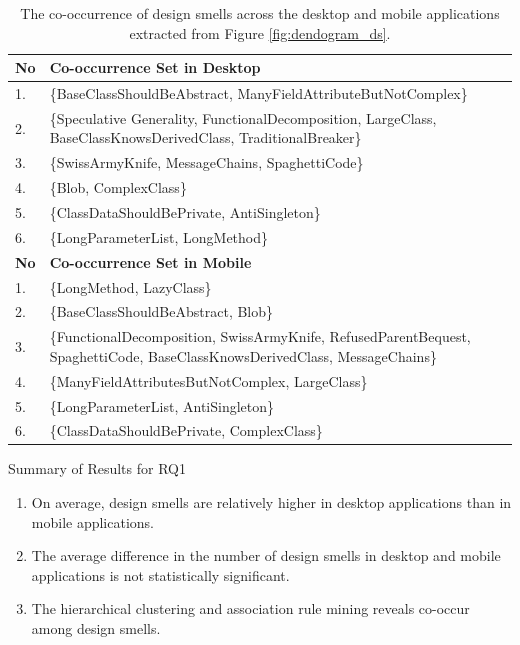 \documentclass[AMA,Times1COL]{WileyNJDv5} %
\begin{document}
	\begin{table}[h!]
	\centering %
	\caption{The co-occurrence of  design smells across the desktop and mobile applications extracted from Figure \ref{fig:dendogram_ds}.} %
	\begin{tabular*}{\textwidth}{@{\extracolsep\fill}ll@{\extracolsep\fill}}%
		
		\toprule
		\textbf{No} & \textbf{Co-occurrence Set in Desktop} \\
		\midrule
		1. & \{BaseClassShouldBeAbstract, ManyFieldAttributeButNotComplex\} \\ 
		2. & \{Speculative Generality, FunctionalDecomposition, LargeClass, BaseClassKnowsDerivedClass, TraditionalBreaker\}  \\ 
		3. &  \{SwissArmyKnife, MessageChains, SpaghettiCode\} \\ 
		4. & \{Blob, ComplexClass\} \\ 
		5. & \{ClassDataShouldBePrivate, AntiSingleton\} \\ 
		6. &  \{LongParameterList, LongMethod\} \\
		\toprule
		\textbf{No} & \textbf{Co-occurrence Set in Mobile}  \\
		\midrule
		1. & \{LongMethod, LazyClass\} \\
		2. & \{BaseClassShouldBeAbstract, Blob\} \\ 
		3. &  \{FunctionalDecomposition, SwissArmyKnife, RefusedParentBequest, SpaghettiCode, BaseClassKnowsDerivedClass, MessageChains\} \\ 
		4. & \{ManyFieldAttributesButNotComplex, LargeClass\} \\ 
		5. & \{LongParameterList, AntiSingleton\} \\ 
		6. &  \{ClassDataShouldBePrivate, ComplexClass\} \\ 
		\bottomrule
	\end{tabular*}
	\label{table:ds_den_table}
\end{table} 
\newpage
	\begin{boxwithhead}
		{Summary of Results for RQ1}
		{\noindent 
			\begin{enumerate}
			\item On average, design smells are relatively higher in desktop applications than in mobile applications. 
			\item The average difference in the number of design smells in desktop and mobile applications is not statistically significant. 
			\item The hierarchical clustering and association rule mining reveals co-occur among design smells.
				\end{enumerate}
			}
	\end{boxwithhead}
	
\end{document}

